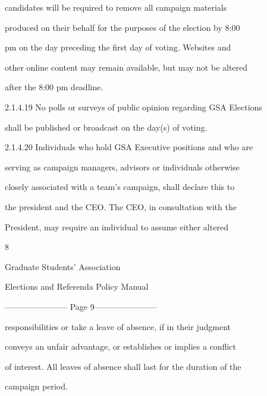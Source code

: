                candidates  will  be  required  to  remove  all  campaign  materials  

               produced on their behalf for the purposes of the election by 8:00  

               pm  on  the  day  preceding  the  first  day  of  voting.  Websites  and  

               other online content may remain available, but may not be altered  

               after the 8:00 pm deadline.   

  

2.1.4.19       No  polls  or  surveys  of  public  opinion  regarding  GSA  Elections  

               shall be published or broadcast on the day(s) of voting.   

  

2.1.4.20       Individuals  who  hold  GSA  Executive  positions  and  who  are  

               serving as campaign managers, advisors or individuals otherwise  

               closely  associated  with  a  team’s  campaign,  shall  declare  this  to  

               the  president  and  the  CEO.  The  CEO,  in  consultation  with  the  

               President,  may  require  an  individual  to  assume  either  altered  



                                                      8  

                                                                                                              

                                Graduate Students’ Association  

                          Elections and Referenda Policy Manual  

  


----------------------- Page 9-----------------------

               responsibilities  or  take  a  leave  of  absence,  if  in  their  judgment  

               conveys an unfair advantage, or establishes or implies a conflict  

               of interest. All leaves of absence shall last for the duration of the  

               campaign period.   

